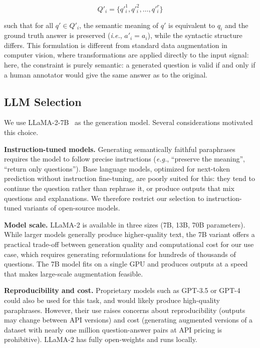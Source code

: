 \begin{equation}
    Q'_i = \{q'^1_i, q'^2_i, \ldots, q'^r_i\}
\end{equation}
 
such that for all $q' \in Q'_i$, the semantic meaning
of $q'$ is equivalent to $q_i$ and the ground truth
answer is preserved (\textit{i.e.}, $a'_i = a_i$),
while the syntactic structure differs. This formulation is different from standard
data augmentation in computer vision, where transformations
are applied directly to the input signal: here, the
constraint is purely semantic: a generated question
is valid if and only if a human annotator would give
the same answer as to the original.
 
\subsection{LLM Selection}
\label{sec:chap3_llm_selection}
 
We use LLaMA-2-7B~\cite{touvron2023llama2openfoundation} as the
generation model. Several considerations motivated
this choice.
 
\textbf{Instruction-tuned models.} Generating
semantically faithful paraphrases requires the model
to follow precise instructions (\textit{e.g.}, ``preserve
the meaning'', ``return only questions''). Base language
models, optimized for next-token prediction without
instruction fine-tuning, are poorly suited for this: they
tend to continue the question rather than rephrase it, or
produce outputs that mix questions and explanations. We
therefore restrict our selection to instruction-tuned
variants of open-source models.
 
\textbf{Model scale.} LLaMA-2 is available in three
sizes (7B, 13B, 70B parameters). While larger models
generally produce higher-quality text, the 7B variant
offers a practical trade-off between generation quality
and computational cost for our use case, which requires
generating reformulations for hundreds of thousands of
questions. The 7B model fits on a single GPU and produces
outputs at a speed that makes large-scale augmentation
feasible.
 
\textbf{Reproducibility and cost.} Proprietary models
such as GPT-3.5 or GPT-4 could also be used for this
task, and would likely produce high-quality paraphrases.
However, their use raises concerns about reproducibility
(outputs may change between API versions) and cost
(generating augmented versions of a dataset with nearly
one million question-answer pairs at API pricing is
prohibitive). LLaMA-2 has fully open-weights and runs
locally.
 
